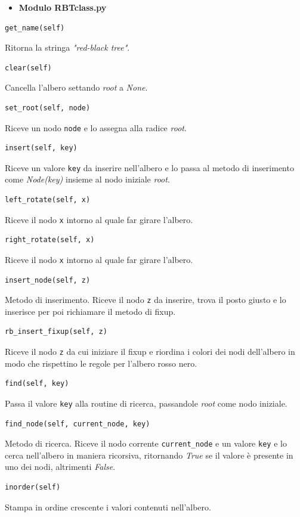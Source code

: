 \documentclass{article}
\begin{document}
\begin{itemize}
    \item \textbf{Modulo RBTclass.py}
\end{itemize}
\begin{verbatim}get_name(self)\end{verbatim}
Ritorna la stringa \emph{"red-black tree"}.
\begin{verbatim}clear(self)\end{verbatim}
Cancella l'albero settando \emph{root} a \emph{None}.
\begin{verbatim}set_root(self, node)\end{verbatim}
Riceve un nodo \verb|node| e lo assegna alla radice \emph{root}.
\begin{verbatim}insert(self, key)\end{verbatim}
Riceve un valore \verb|key| da inserire nell'albero e lo passa al metodo di inserimento come \emph{Node(key)} insieme al nodo iniziale \emph{root}.
\begin{verbatim}left_rotate(self, x)\end{verbatim}
Riceve il nodo \verb|x| intorno al quale far girare l'albero.
\begin{verbatim}right_rotate(self, x)\end{verbatim}
Riceve il nodo \verb|x| intorno al quale far girare l'albero.
\begin{verbatim}insert_node(self, z)\end{verbatim}
Metodo di inserimento. Riceve il nodo \verb|z| da inserire, trova il posto giusto e lo inserisce per poi richiamare il metodo di fixup.
\begin{verbatim}rb_insert_fixup(self, z)\end{verbatim}
Riceve il nodo \verb|z| da cui iniziare il fixup e riordina i colori dei nodi dell'albero in modo che rispettino le regole per l'albero rosso nero.
\begin{verbatim}find(self, key)\end{verbatim}
Passa il valore \verb|key| alla routine di ricerca, passandole \emph{root} come nodo iniziale.
\begin{verbatim}find_node(self, current_node, key)\end{verbatim}
Metodo di ricerca. Riceve il nodo corrente \verb|current_node| e un valore \verb|key| e lo cerca nell'albero in maniera ricorsiva, ritornando \emph{True} se il valore è presente in uno dei nodi, altrimenti \emph{False}.
\begin{verbatim}inorder(self)\end{verbatim}
Stampa in ordine crescente i valori contenuti nell'albero.\\
\end{document}

